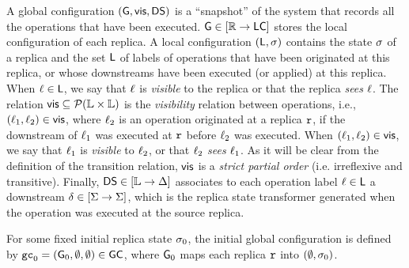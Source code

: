 A global configuration $(\mathsf{G}, \mathsf{vis}, \mathsf{DS})$ is a
``snapshot'' of the system that records all the operations that have
been executed.
$\mathsf{G} \in [\mathbb{R} \rightarrow \mathsf{LC}]$ stores the local
configuration of each replica.
A local configuration $(\mathsf{L}, \sigma)$ contains the state
$\sigma$ of a replica and the set $\mathsf{L}$ of labels of
operations that have been originated at this replica, or whose
downstreams have been executed (or applied) at this replica.
When $\ell\in \mathsf{L}$, we say that $\ell$ is \emph{visible}
to the replica or that the replica \emph{sees} $\ell$.
The relation $\mathsf{vis}\subseteq \mathcal{P}(\mathbb{L} \times \mathbb{L})$ is
the \emph{visibility} relation between operations, i.e.,
$(\ell_1,\ell_2)\in \mathsf{vis}$, where $\ell_2$ is an operation
originated at a replica $\mathtt{r}$, if the downstream of $\ell_1$ was
executed at $\mathtt{r}$ before $\ell_2$ was executed.
When $(\ell_1,\ell_2)\in \mathsf{vis}$, we say that $\ell_1$ is
\emph{visible} to $\ell_2$, or that $\ell_2$ \emph{sees}
$\ell_1$.
As it will be clear from the definition of the transition relation,
$\mathsf{vis}$ is a \emph{strict partial order} (i.e.
irreflexive and transitive).
Finally, $\mathsf{DS}\in [\mathbb{L} \rightarrow \Delta]$ associates to
each operation label $\ell \in \mathsf{L}$ a downstream
$\delta\in [\Sigma \rightarrow \Sigma]$, which is the replica
state transformer generated when the operation was executed at the
source replica.

For some fixed initial replica state $\sigma_0$, the initial global configuration is defined by $\mathtt{gc}_0 = (\mathsf{G}_0, \emptyset, \emptyset) \in \mathsf{GC}$, where $\mathsf{G}_0$ maps each replica $\mathtt{r}$ into $(\emptyset, \sigma_0)$.


